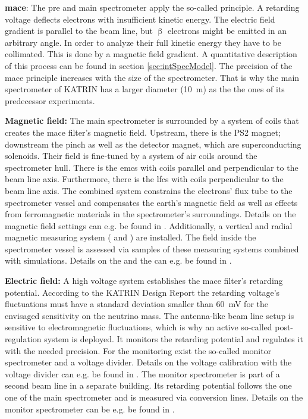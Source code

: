 {\par \textbf{\Gls{mace}}: The pre and main spectrometer apply the so-called  principle. A retarding voltage deflects electrons with insufficient kinetic energy. The electric field gradient is parallel to the beam line, but $\upbeta$ electrons might be emitted in an arbitrary angle. In order to analyze their full kinetic energy they have to be collimated. This is done by a magnetic field gradient. A quantitative description of this process can be found in section \ref{sec:intSpecModel}. The precision of the \gls{mace} principle increases with the size of the spectrometer. That is why the main spectrometer of KATRIN has a larger diameter (\SI{10}{m}) as the the ones of its predecessor experiments.
}

{\par \textbf{Magnetic field:} The main spectrometer is surrounded by a system of coils that creates the \gls{mace} filter's  magnetic field. Upstream, there is the PS2 magnet; downstream the pinch as well as the detector magnet, which are superconducting solenoids. Their field is fine-tuned by a system of air coils around the spectrometer hull. There is the \gls{emcs} with coils parallel and perpendicular to the beam line axis. Furthermore, there is the \gls{lfcs} with coils perpendicular to the beam line axis. The combined system constrains the electrons' flux tube to the spectrometer vessel and compensates the earth's magnetic field as well as effects from ferromagnetic materials in the spectrometer's surroundings. Details on the magnetic field settings can e.g. be found in \cite{Erhard2018}. Additionally, a vertical and radial magnetic measuring system ( and ) are installed. The field inside the spectrometer vessel is assessed via samples of these measuring systems combined with simulations. Details on the  and the  can e.g. be found in \cite{Letnev2018}.}

{\par \textbf{Electric field:} A high voltage system establishes the \gls{mace} filter's retarding potential. According to the KATRIN Design Report \cite{Angrik:2005ep} the retarding voltage's fluctuations must have a standard deviation smaller than \SI{60}{mV} for the envisaged sensitivity on the neutrino mass. The antenna-like beam line setup is sensitive to electromagnetic fluctuations, which is why an active so-called post-regulation system is deployed. It monitors the retarding potential and regulates it with the needed precision. For the monitoring exist the so-called monitor spectrometer and a voltage divider. Details on the voltage calibration with the voltage divider can e.g. be found in \cite{Thuemmler2009}. The monitor spectrometer is part of a second beam line in a separate building. Its retarding potential follows the one one of the main spectrometer and is measured via \kryptonEightyThree{} conversion lines. Details on the monitor spectrometer can be e.g. be found in \cite{Erhard2014}.}

